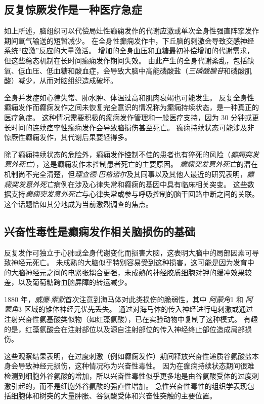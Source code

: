 \subsection{反复惊厥发作是一种医疗急症}

如上所述，脑组织可以代偿局灶性癫痫发作的代谢应激或单次全身性强直阵挛发作期间氧气输送的短暂减少。
在全身性癫痫发作中，下丘脑的刺激会导致交感神经系统“应激”反应的大量激活。
增加的全身血压和血糖最初补偿增加的代谢需求，但这些稳态机制在长时间癫痫发作期间失效。
由此产生的全身代谢紊乱，包括缺氧、低血压、低血糖和酸血症，会导致大脑中高能磷酸盐（\textit{三磷酸腺苷}和磷酸肌酸）减少，从而对脑组织造成破坏。


全身并发症如心律失常、肺水肿、体温过高和肌肉衰竭也可能发生。
反复全身性癫痫发作而癫痫发作之间未恢复完全意识的情况称为癫痫持续状态，是一种真正的医疗急症。
这种情况需要积极的癫痫发作管理和一般医疗支持，因为 30 分钟或更长时间的连续痉挛性癫痫发作会导致脑损伤甚至死亡。
癫痫持续状态可能涉及非惊厥性癫痫发作，其代谢后果要轻得多。


除了癫痫持续状态的危险外，癫痫发作控制不佳的患者也有猝死的风险（\textit{癫痫突发意外死亡}），这是癫痫发作未控制患者死亡的主要原因。
\textit{癫痫突发意外死亡}的潜在机制尚不完全清楚，但\textit{理查德$\cdot$巴格诺尔}及其同事以及其他人最近的研究表明，\textit{癫痫突发意外死亡}病例在涉及心律失常和癫痫的基因中具有临床相关突变。
这些数据支持\textit{癫痫突发意外死亡}与心律失常或参与呼吸控制的脑干回路中断之间的关联。
这个话题恰如其分地成为当前激烈调查的焦点。



\subsection{兴奋性毒性是癫痫发作相关脑损伤的基础}

反复发作可独立于心肺或全身代谢变化而损害大脑，这表明大脑中的局部因素可导致神经元死亡。
未成熟的大脑似乎特别容易受到这种损害，这可能是因为发育中的大脑神经元之间的电紧张耦合更强，未成熟的神经胶质细胞对钾的缓冲效果较差，以及葡萄糖跨血脑屏障的转运减少。


1880 年，\textit{威廉$\cdot$索默}首次注意到海马体对此类损伤的脆弱性，其中 \textit{阿蒙角}1 和 \textit{阿蒙角}3 区域的锥体神经元优先丢失。
通过对海马体的传入神经进行电刺激或通过注射兴奋性氨基酸类似物（如红藻氨酸），已在实验动物中复制了这种模式。
有趣的是，红藻氨酸会在注射部位以及源自注射部位的传入神经终止部位造成局部损伤。


这些观察结果表明，在过度刺激（例如癫痫发作）期间释放兴奋性递质谷氨酸盐本身会导致神经元损伤，这种情况称为兴奋性毒性。
因为在癫痫持续状态期间很难检测到细胞外谷氨酸的增加，所以兴奋性毒性似乎更多地是由谷氨酸受体的过度刺激引起的，而不是细胞外谷氨酸的强直性增加。
急性兴奋性毒性的组织学表现包括细胞体和树突的大量肿胀、谷氨酸受体和兴奋性突触的主要位置。


